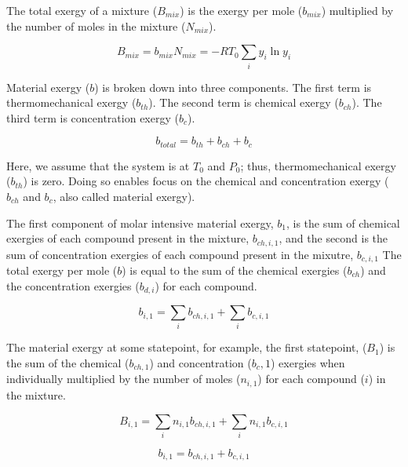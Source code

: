 \documentclass[energies,article,submit,pdftex,moreauthors]{Definitions/mdpi}
\begin{document}
The total exergy of a mixture ($B_{mix}$) is the exergy per mole ($b_{mix}$)
multiplied by the number of moles
in the mixture ($N_{mix}$).

\begin{equation}\label{eq:specific_exergy_of_mixture_definition2}
  B_{mix} = {b_{mix}}{N_{mix}} = -RT_{0}\sum_{i}y_{i}\ln{y_{i}}
\end{equation}

Material exergy ($b$) is broken down into three components.
The first term is thermomechanical exergy ($b_{th}$).
The second term is chemical exergy ($b_{ch}$).
The third term is concentration exergy ($b_{c}$).

\begin{equation}\label{eq:general_material_exergy_definition}
 b_{total} = b_{th} + b_{ch} + b_{c}
\end{equation}

Here, we assume that the system is at
$T_{0}$ and $P_{0}$;
thus, thermomechanical exergy ($b_{th}$) is zero.
Doing so enables focus on the chemical and concentration exergy
($b_{ch}$ and $b_{c}$, also called material exergy).

The first component of molar intensive material exergy, $b_{1}$,
is the sum of chemical exergies of each compound
present in the mixture, $b_{ch,i,1}$,
and the second is the sum of concentration exergies of each compound
present in the mixutre, $b_{c,i,1}$
The total exergy per mole ($b$) is equal to the sum of the chemical exergies ($b_{ch}$)
and the concentration exergies ($b_{d,i}$) for each compound.

\begin{equation}\label{eq:specific_molar_intensive_exergy_definition}
  b_{i,1} = \sum_{i}{b_{ch,i,1}} + \sum_{i}{b_{c,i,1}}
\end{equation}


The material exergy at some statepoint, for example, the first statepoint, ($B_{1}$)
is the sum of the chemical ($b_{ch,1}$) and concentration ($b_c,1$) exergies
when individually multiplied
by the number of moles ($n_{i,1}$)
for each compound ($i$) in the mixture.

\begin{equation}\label{eq:specific_exergy_definition}
  B_{i,1} = \sum_{i}{n_{i,1}b_{ch,i,1}} + \sum_{i}{n_{i,1}b_{c,i,1}}
\end{equation}

\begin{equation}\label{eq:simplified_material_exergy_definition}
  b_{i,1} = b_{ch,i,1} + b_{c,i,1}
\end{equation}
\end{document}
